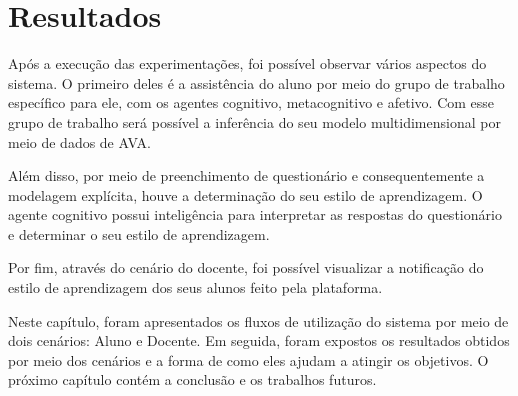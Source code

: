 \section{Resultados}\label{section:resultados}
Após a execução das experimentações, foi possível observar vários aspectos do sistema. O primeiro deles é a assistência do aluno por meio do grupo de trabalho específico para ele, com os agentes cognitivo, metacognitivo e afetivo. Com esse grupo de trabalho será possível a inferência do seu modelo multidimensional por meio de dados de AVA.

Além disso, por meio de preenchimento de questionário e consequentemente a modelagem explícita, houve a determinação do seu estilo de aprendizagem. O agente cognitivo possui inteligência para interpretar as respostas do questionário e determinar o seu estilo de aprendizagem.

Por fim, através do cenário do docente, foi possível visualizar a notificação do estilo de aprendizagem dos seus alunos feito pela plataforma.

Neste capítulo, foram apresentados os fluxos de utilização do sistema por meio de dois cenários: Aluno e Docente. Em seguida, foram expostos os resultados obtidos por meio dos cenários e a forma de como eles ajudam a atingir os objetivos. O próximo capítulo contém a conclusão e os trabalhos futuros.
